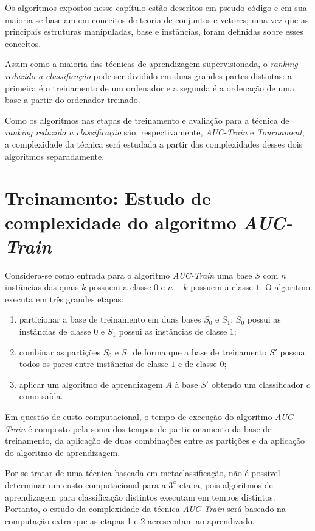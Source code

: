 Os algoritmos expostos nesse capítulo estão descritos em pseudo-código e em sua maioria se baseiam em conceitos de teoria de conjuntos e vetores; uma vez que as principais estruturas manipuladas, base e instâncias, foram definidas sobre esses conceitos.

Assim como a maioria das técnicas de aprendizagem supervisionada, o \emph{ranking reduzido a classificação} pode ser dividido em duas grandes partes distintas: a primeira é o treinamento de um ordenador e a segunda é a ordenação de uma base a partir do ordenador treinado.

Como os algoritmos nas etapas de treinamento e avaliação para a técnica de \emph{ranking reduzido a classificação} são, respectivamente, \emph{AUC-Train} e \emph{Tournament}; a complexidade da técnica será estudada a partir das complexidades desses dois algoritmos separadamente.


\section{Treinamento: Estudo de complexidade do algoritmo \emph{AUC-Train}}

Considera-se como entrada para o algoritmo \emph{AUC-Train} uma base $S$ com $n$ instâncias das quais $k$ possuem a classe $0$ e $n - k$ possuem a classe $1$. O algoritmo executa em três grandes etapas:

\begin{enumerate}
    \item particionar a base de treinamento em duas bases $S_0$ e $S_1$; $S_0$ possui as instâncias de classe $0$ e $S_1$ possui as instâncias de classe $1$;
    \item combinar as partições $S_0$ e $S_1$ de forma que a base de treinamento $S'$ possua todos os pares entre instâncias de classe $1$ e de classe $0$;
    \item aplicar um algoritmo de aprendizagem $A$ à base $S'$ obtendo um classificador $c$ como saída.
\end{enumerate}

Em questão de custo computacional, o tempo de execução do algoritmo \emph{AUC-Train} é composto pela soma dos tempos de particionamento da base de treinamento, da aplicação de duas combinações entre as partições e da aplicação do algoritmo de aprendizagem.

Por se tratar de uma técnica baseada em metaclassificação, não é possível determinar um custo computacional para a $3^a$ etapa, pois algoritmos de aprendizagem para classificação distintos executam em tempos distintos. Portanto, o estudo da complexidade da técnica \emph{AUC-Train} será baseado na computação extra que as etapas 1 e 2 acrescentam ao aprendizado.


